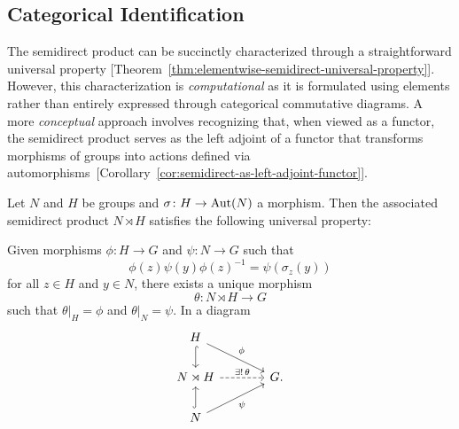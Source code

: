 \subsection*{Categorical Identification} The semidirect product can be succinctly characterized through a straightforward universal property [Theorem~\ref{thm:elementwise-semidirect-universal-property}]. However, this characterization is \textit{computational\/} as it is formulated using elements rather than entirely expressed through categorical commutative diagrams. A more \textit{conceptual\/} approach involves recognizing that, when viewed as a functor, the semidirect product serves as the left adjoint of a functor that transforms morphisms of groups into actions defined via automorphisms~[Corollary~\ref{cor:semidirect-as-left-adjoint-functor}].

\begin{thm}\label{thm:elementwise-semidirect-universal-property}
    Let\/ $N$ and\/ $H$ be groups and\/ $\sigma\colon H\to{\rm Aut}(N)$ a morphism. Then the associated semidirect product\/ $N\rtimes H$ satisfies the following universal property:

    Given morphisms\/ $\phi\colon H\to G$ and\/ $\psi\colon N\to G$ such that
    \begin{equation}\label{eq:elementwise-semidirect-universal-property}
        \phi(z)\psi(y)\phi(z)^{-1}=\psi(\sigma_z(y))
    \end{equation}
    for all\/ $z\in H$ and\/ $y\in N$, there exists a unique morphism
    $$
        \theta\colon N\rtimes H\to G
    $$
    such that\/ $\theta|_H=\phi$ and $\theta|_N=\psi$. In a diagram
    $$
        \begin{tikzcd}[column sep=large]
            H
                    \arrow[d,hook]
                    \arrow[rd,"\phi"]\\
            N\rtimes H
                    \arrow[r,"\exists!\,\theta",dashed]
                &G.\\
            N
                    \arrow[u,hook]
                    \arrow[ru,"\psi"']
        \end{tikzcd}
    $$
\end{thm}

